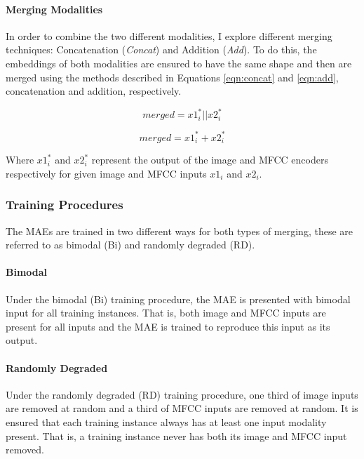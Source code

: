 \paragraph{Merging Modalities}
In order to combine the two different modalities, I explore different merging techniques: Concatenation (\textit{Concat}) and Addition (\textit{Add}). To do this, the embeddings of both modalities are ensured to have the same shape and then are merged using the methods described in Equations \ref{eqn:concat} and \ref{eqn:add}, concatenation and addition, respectively. %

 \begin{equation}
 	merged = x1^*_i || x2^*_i
 	\label{eqn:concat}
 \end{equation}

 \begin{equation}
 	merged = x1^*_i + x2^*_i
 	\label{eqn:add}  
 \end{equation}
 

Where $x1^*_i$ and $x2^*_i$ represent the output of the image and MFCC encoders respectively for given image and MFCC inputs $x1_i$ and $x2_i$.

\subsubsection{Training Procedures}

The MAEs are trained in two different ways for both types of merging, these are referred to as bimodal (Bi) and randomly degraded (RD).

\paragraph{Bimodal}
Under the bimodal (Bi) training procedure, the MAE is presented with bimodal input for all training instances. That is, both image and MFCC inputs are present for all inputs and the MAE is trained to reproduce this input as its output.

\paragraph{Randomly Degraded}
Under the randomly degraded (RD) training procedure, one third of image inputs are removed at random and a third of MFCC inputs are removed at random. It is ensured that each training instance always has at least one input modality present. That is, a training instance never has both its image and MFCC input removed. 

